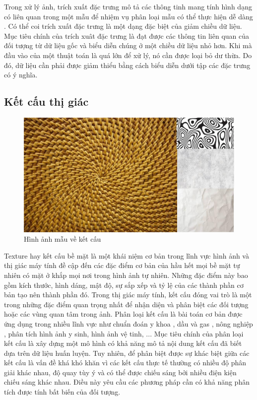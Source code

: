 Trong xử lý ảnh, trích xuất đặc trưng mô tả các thông tinh mang tính hình dạng có liên quan trong một mẫu để nhiệm vụ phân loại mẫu có thể thực hiện dễ dàng \cite{featureImgprocessing}. Có thể coi trích xuất đặc trưng là một dạng đặc biệt của giảm chiều dữ liệu. Mục tiêu chính của trích xuât đặc trưng là đạt được các thông tin liên quan của đối tượng từ dữ liệu gốc và biểu diễn chúng ở một chiều dữ liệu nhỏ hơn. Khi mà đầu vào của một thuật toán là quá lớn để xử lý, nó cần được loại bỏ dư thừa. Do đó, dữ liệu cần phải được giảm thiểu bằng cách biểu diễn dưới tập các đặc trưng có ý nghĩa. 
\subsection{Kết cấu thị giác}

\begin{figure} [h]
	\centering
	\includegraphics[width=0.8\linewidth]{figures/image1.png}
	\caption{Hình ảnh mẫu về kết cấu}
	\label{fig:image1}
\end{figure}
Texture hay kết cấu bề mặt là một khái niệm cơ bản trong lĩnh vực hình ảnh và thị giác máy tính đề cập đến các đặc điểm cơ bản của hầu hết mọi bề mặt tự nhiên có mặt ở khắp mọi nơi trong hình ảnh tự nhiên. Những đặc điểm này bao gồm kích thước, hình dáng, mật độ, sự sắp xếp và tỷ lệ của các thành phần cơ bản tạo nên thành phần đó. Trong thị giác máy tính, kết cấu đóng vai trò là một trong những đặc điểm quan trọng nhất để nhận diện và phân biệt các đối tượng hoặc các vùng quan tâm trong ảnh. Phân loại kết cấu là bài toán cơ bản được ứng dụng trong nhiều lĩnh vực như chuẩn đoán y khoa \cite{medicalImage}, dầu và gas \cite{textureBasedTechniques}, nông nghiệp \cite{smartFarming}, phân tích hình ảnh y sinh, hình ảnh vệ tinh, ... Mục tiêu chính của phân loại kết cấu là xây dựng một mô hình có khả năng mô tả nội dung kết cấu đã biết dựa trên dữ liệu huấn luyện. Tuy nhiên, để phân biệt được sự khác biệt giữa các kết cấu là vấn đề khá khó khăn vì các kết cấu thực tế thường có nhiều độ phân giải khác nhau, độ quay tùy ý và có thể được chiếu sáng bởi nhiều điện kiện chiếu sáng khác nhau. Điều này yêu cầu các phương pháp cần có khả năng phân tích được tính bất biến của đối tượng.


